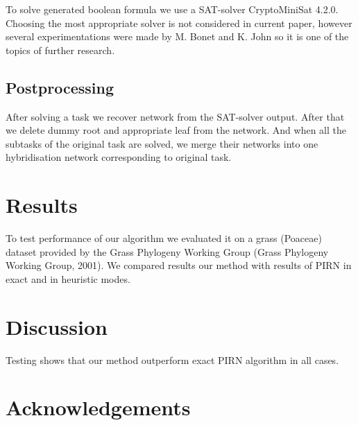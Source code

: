\documentclass[runningheads, envcountsame, a4paper]{llncs}
\begin{document}
To solve generated boolean formula we use a SAT-solver CryptoMiniSat 4.2.0. Choosing the most appropriate solver is not considered in current paper, however several experimentations were made by M. Bonet and K. John \cite {bonet2009efficiently} so it is one of the topics of further research.

\subsection{Postprocessing}

After solving a task we recover network from the SAT-solver output. After that we delete dummy root and appropriate leaf from the network. And when all the subtasks of the original task are solved, we merge their networks into one hybridisation network corresponding to original task.

\section{Results}

To test performance of our algorithm we evaluated it on a grass (Poaceae) dataset provided by the Grass Phylogeny Working Group (Grass Phylogeny Working Group, 2001). We compared results our method with results of PIRN in exact and in heuristic modes. 

\section{Discussion}

Testing shows that our method outperform exact PIRN algorithm in all cases.

\section*{Acknowledgements}



\clearpage
\end{document}
